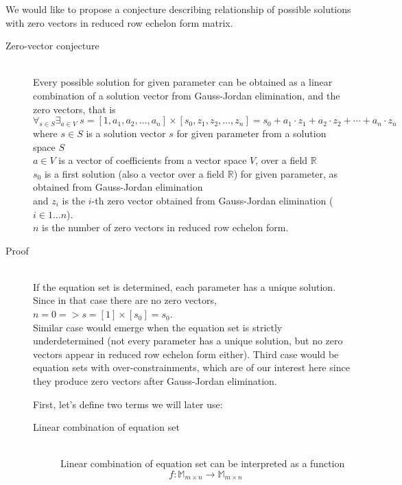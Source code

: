 We would like to propose a conjecture describing relationship of possible solutions with zero vectors in reduced row echelon form matrix.
\begin{description}
	\item[Zero-vector conjecture] \hfill \\
        Every possible solution for given parameter can be obtained as a linear combination of a solution vector from Gauss-Jordan elimination, and the zero vectors, that is
    \begin{equation}
        \forall_{s \in S} \displaystyle\exists_{a \in V} \; s = [1,a_1,a_2,\ldots,a_n]\times[s_0,z_1,z_2,\ldots,z_n]=s_0 + a_1 \cdot z_1 + a_2 \cdot z_2 +\cdots+a_n \cdot z_n
    \end{equation}
    where $s \in S$ is a solution vector $s$ for given parameter from a solution space $S$ \\
    $a \in V$ is a vector of coefficients from a vector space $V$, over a field $\mathbb{R}$ \\
    $s_0$ is a first solution (also a vector over a field $\mathbb{R}$) for given parameter, as obtained from Gauss-Jordan elimination \\
    and $z_i$ is the $i$-th zero vector obtained from Gauss-Jordan elimination ($i \in 1\ldots n$). \\
    $n$ is the number of zero vectors in reduced row echelon form.
	\item[Proof] \hfill \\
    If the equation set is determined, each parameter has a unique solution. Since in that case there are no zero vectors, $n=0 => s = [1] \times [s_0] = s_0$.\\
    Similar case would emerge when the equation set is strictly underdetermined (not every parameter has a unique solution, but no zero vectors appear in reduced row echelon form either).
    Third case would be equation sets with over-constrainments, which are of our interest here since they produce zero vectors after Gauss-Jordan elimination.

    First, let's define two terms we will later use:

    \begin{description}
    	\item[Linear combination of equation set] \hfill \\
            Linear combination of equation set can be interpreted as a function
            \begin{equation}
                f: \mathbb{M}_{m \times n} \to \mathbb{M}_{m \times n}
            \end{equation}


\end{description}
\end{description}
